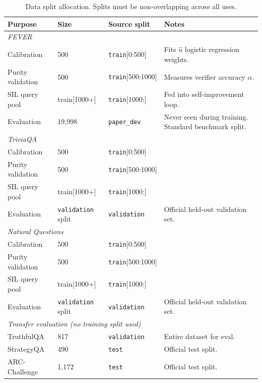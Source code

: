 \documentclass[12pt,a4paper]{article}
\newcommand{\uhat}{\hat{u}}
\begin{document}
\begin{table}[htbp]
\centering
\caption{Data split allocation. Splits must be non-overlapping across all uses.}
\label{tab:splits}
\renewcommand{\arraystretch}{1.3}
\begin{tabular}{@{}p{3.2cm}p{2.4cm}p{2.4cm}p{5.2cm}@{}}
\toprule
\textbf{Purpose} & \textbf{Size} & \textbf{Source split} & \textbf{Notes} \\
\midrule
\multicolumn{4}{l}{\textit{FEVER}} \\
Calibration & 500 & \texttt{train}[0:500] &
  Fits $\uhat$ logistic regression weights. \\
Purity validation & 500 & \texttt{train}[500:1000] &
  Measures verifier accuracy $\alpha$. \\
SIL query pool & train[1000+] & \texttt{train}[1000:] &
  Fed into self-improvement loop. \\
Evaluation & 19,998 & \texttt{paper\_dev} &
  Never seen during training. Standard benchmark split. \\
\midrule
\multicolumn{4}{l}{\textit{TriviaQA}} \\
Calibration & 500 & \texttt{train}[0:500] & \\
Purity validation & 500 & \texttt{train}[500:1000] & \\
SIL query pool & train[1000+] & \texttt{train}[1000:] & \\
Evaluation & \texttt{validation} split & \texttt{validation} &
  Official held-out validation set. \\
\midrule
\multicolumn{4}{l}{\textit{Natural Questions}} \\
Calibration & 500 & \texttt{train}[0:500] & \\
Purity validation & 500 & \texttt{train}[500:1000] & \\
SIL query pool & train[1000+] & \texttt{train}[1000:] & \\
Evaluation & \texttt{validation} split & \texttt{validation} &
  Official held-out validation set. \\
\midrule
\multicolumn{4}{l}{\textit{Transfer evaluation (no training split used)} } \\
TruthfulQA & 817 & \texttt{validation} & Entire dataset for eval. \\
StrategyQA & 490 & \texttt{test} & Official test split. \\
ARC-Challenge & 1,172 & \texttt{test} & Official test split. \\
\bottomrule
\end{tabular}
\end{table}
\end{document}
